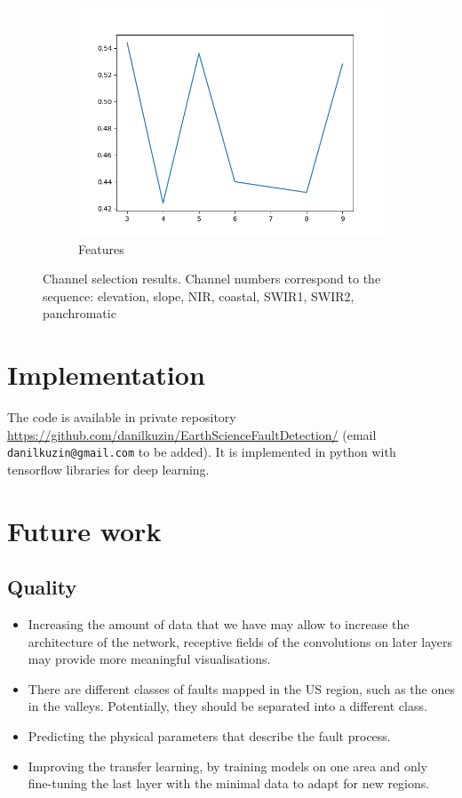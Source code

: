 \documentclass[11pt,a4paper]{article}
\begin{document}
\begin{figure}[t]
    \centering
    \begin{subfigure}[b]{0.3\textwidth}
        \includegraphics[width=\textwidth]{graphics/feature_selection.png}
        \caption{Features}
    \end{subfigure}

    \caption{Channel selection results. Channel numbers correspond to the sequence: elevation, slope, NIR, coastal,
    SWIR1, SWIR2, panchromatic}
    \label{fig:feature_selection}
\end{figure}

\section{Implementation}
The code is available in private repository \url{https://github.com/danilkuzin/EarthScienceFaultDetection/}
(email \texttt{danilkuzin@gmail.com} to be added). It is
implemented in python with tensorflow libraries for deep learning.

\section{Future work}
\subsection{Quality}
    \begin{itemize}
        \item Increasing the amount of data that we have may allow to increase the architecture of the network, receptive
            fields of the convolutions on later layers may provide more meaningful visualisations.
        \item There are different classes of faults mapped in the US region, such as the ones in the valleys. Potentially,
            they should be separated into a different class.
        \item Predicting the physical parameters that describe the fault process.
        \item Improving the transfer learning, by training models on one area and only fine-tuning the last layer with
            the minimal data to adapt for new regions.
    \end{itemize}
\end{document}
